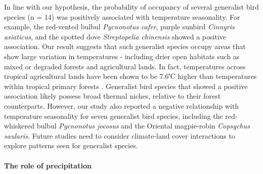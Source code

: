 In line with our hypothesis, the probability of occupancy of several generalist bird species (n = 14) was positively associated with temperature seasonality.
For example, the red-vented bulbul \textit{Pycnonotus cafer}, purple sunbird \textit{Cinnyris asiaticus}, and the spotted dove \textit{Streptopelia chinensis} showed a positive association.
Our result suggests that such generalist species occupy areas that show large variation in temperatures - including drier open habitats such as mixed or degraded forests and agricultural lands.
In fact, temperatures across tropical agricultural lands have been shown to be 7.6℃ higher than temperatures within tropical primary forests \citep{senior2017}.
Generalist bird species that showed a positive association likely possess broad thermal niches, relative to their forest counterparts.
However, our study also reported a negative relationship with temperature seasonality for seven generalist bird species, including the red-whiskered bulbul \textit{Pycnonotus jocosus} and the Oriental magpie-robin \textit{Copsychus saularis}.
Future studies need to consider climate-land cover interactions to explore patterns seen for generalist species.

\paragraph*{The role of precipitation}


